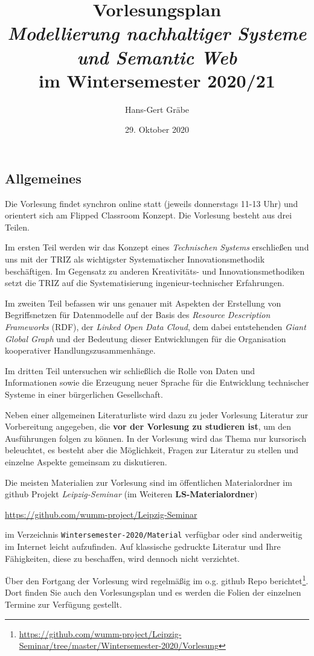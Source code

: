\documentclass[11pt,a4paper]{article}
\title{Vorlesungsplan \\[1em] \emph{Modellierung nachhaltiger Systeme und
    Semantic Web} \\[1em] im Wintersemester 2020/21}
\author{Hans-Gert Gr\"abe}
\date{29. Oktober 2020}
\begin{document}
\maketitle
\subsection{Allgemeines}

Die Vorlesung findet synchron online statt (jeweils donnerstags 11-13 Uhr) und
orientert sich am Flipped Classroom Konzept. Die Vorlesung besteht aus drei
Teilen.

Im ersten Teil werden wir das Konzept eines \emph{Technischen Systems}
erschließen und uns mit der TRIZ als wichtigster Systematischer
Innovationsmethodik beschäftigen.  Im Gegensatz zu anderen Kreativitäts- und
Innovationsmethodiken setzt die TRIZ auf die Systematisierung
ingenieur-technischer Erfahrungen. 

Im zweiten Teil befassen wir uns genauer mit Aspekten der Erstellung von
Begriffsnetzen für Datenmodelle auf der Basis des \emph{Resource Description
  Frameworks} (RDF), der \emph{Linked Open Data Cloud}, dem dabei entstehenden
\emph{Giant Global Graph} und der Bedeutung dieser Entwicklungen für die
Organisation kooperativer Handlungszusammenhänge.

Im dritten Teil untersuchen wir schließlich die Rolle von Daten und
Informationen sowie die Erzeugung neuer Sprache für die Entwicklung
technischer Systeme in einer bürgerlichen Gesellschaft.

Neben einer allgemeinen Literaturliste wird dazu zu jeder Vorlesung Literatur
zur Vorbereitung angegeben, die \textbf{vor der Vorlesung zu studieren ist},
um den Ausführungen folgen zu können. In der Vorlesung wird das Thema nur
kursorisch beleuchtet, es besteht aber die Möglichkeit, Fragen zur Literatur
zu stellen und einzelne Aspekte gemeinsam zu diskutieren.

Die meisten Materialien zur Vorlesung sind im öffentlichen Materialordner im
github Projekt \emph{Leipzig-Seminar} (im Weiteren \textbf{LS-Materialordner})
\begin{center}
  \url{https://github.com/wumm-project/Leipzig-Seminar}
\end{center}
im Verzeichnis \texttt{Wintersemester-2020/Material} verfügbar oder sind
anderweitig im Internet leicht aufzufinden. Auf klassische gedruckte Literatur
und Ihre Fähigkeiten, diese zu beschaffen, wird dennoch nicht verzichtet.

Über den Fortgang der Vorlesung wird regelmäßig im o.g. github Repo
berichtet\footnote{\url{https://github.com/wumm-project/Leipzig-Seminar/tree/master/Wintersemester-2020/Vorlesung}}.
Dort finden Sie auch den Vorlesungsplan und es werden die Folien der einzelnen
Termine zur Verfügung gestellt.
\end{document}
